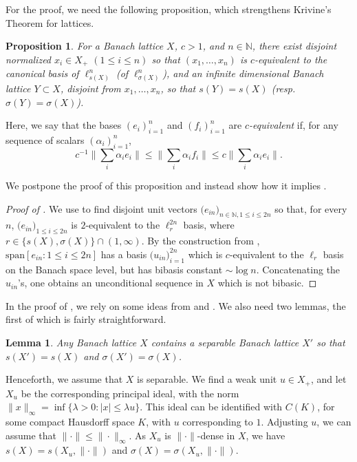 \documentclass[12pt,leqno]{amsart}
\newtheorem{proposition}[theorem]{Proposition}
\newtheorem{lemma}[theorem]{Lemma}
\numberwithin{equation}{section}
\theoremstyle{definition}
\def\N{{\mathbb N}}
\newcommand{\spn}{\mathrm{span}}
\begin{document}
For the proof, we need the following proposition, which strengthens Krivine's Theorem for lattices. %

\begin{proposition}\label{p:krivine}
    For a Banach lattice $X$, $c > 1$, and $n \in \N$, there exist disjoint normalized $x_i \in X_+$ $(1 \leq i \leq n)$ so that $(x_1, \ldots, x_n)$ is $c$-equivalent to the canonical basis of $\ell_{s(X)}^n$ (of $\ell_{\sigma(X)}^n$), and an infinite dimensional Banach lattice $Y \subset X$, disjoint from $x_1, \ldots, x_n$, so that $s(Y) = s(X)$ (resp.~$\sigma(Y) = \sigma(X)$).
\end{proposition}

Here, we say that the bases $(e_i)_{i=1}^n$ and $(f_i)_{i=1}^n$ are \emph{$c$-equivalent} if, for any sequence of scalars $(\alpha_i)_{i=1}^n$,
$$
c^{-1} \big\| \sum_i \alpha_i e_i \big\| \leq \big\| \sum_i \alpha_i f_i \big\| \leq c \big\| \sum_i \alpha_i e_i \big\| .
$$

We postpone the proof of this proposition and instead show how it implies .
\begin{proof}[Proof of ]
We use  to find disjoint unit vectors $\big(e_{in}\big)_{n \in \N, 1 \leq i \leq 2n}$ so that, for every $n$, $\big(e_{in}\big)_{1 \leq i \leq 2n}$ is $2$-equivalent to the $\ell_r^{2n}$ basis, where $r \in \{s(X),\sigma(X)\} \cap (1,\infty)$.
By the construction from , $\spn [ e_{in} : 1 \leq i \leq 2n]$ has a basis $\big( u_{in} \big)_{i=1}^{2n}$ which is $c$-equivalent to the $\ell_r$ basis on the Banach space level, but has bibasis constant $\sim \log n$. Concatenating the $u_{in}$'s, one obtains an unconditional sequence in $X$ which is not bibasic.
\end{proof}

In the proof of , we rely on some ideas from  \cite{Abramovich78} and \cite{AbLoz}. We also need two lemmas, the first of which is fairly straightforward.

\begin{lemma}\label{separability}
    Any Banach lattice $X$ contains a separable Banach lattice $X'$ so that $s(X') = s(X)$ and $\sigma(X') = \sigma(X)$.
\end{lemma}


Henceforth, we assume that $X$ is separable. We find a weak unit $u \in X_+$, and let $X_u$ be the corresponding principal ideal, with the norm $\|x\|_\infty = \inf \{ \lambda > 0 : |x| \leq \lambda u\}$.
This ideal can be identified with $C(K)$, for some compact Hausdorff space $K$, with $u$ corresponding to $1$. Adjusting $u$, we can assume that $\| \cdot \| \leq \| \cdot \|_\infty$.
As $X_u$ is $\| \cdot \|$-dense in $X$, we have $s(X) = s(X_u, \| \cdot \|)$ and $\sigma(X) = \sigma(X_u, \| \cdot \|)$.
\medskip
\end{document}

